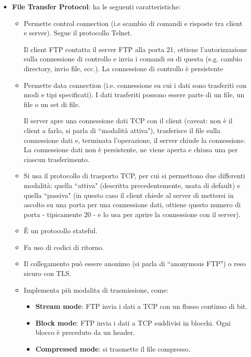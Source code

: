 \documentclass[11pt, italian, openany]{book}
\begin{document}
\begin{sloppypar}
\begin{itemize}[topsep=0pt]
	Per interrogazioni a server DNS si usa il tool "dig".
	\item \textbf{File Transfer Protocol}: ha le seguenti caratteristiche:
	\vspace{-3.5mm}
	\begin{itemize}
		\itemsep-0.3em
		\item Permette control connection (i.e scambio di comandi e risposte tra client e server). Segue il protocollo Telnet.

		Il client FTP contatta il server FTP alla porta 21, ottiene l’autorizzazione sulla connessione di controllo e invia i comandi su di questa
		(e.g. cambio directory, invio file, ecc.). La connessione di controllo \`e persistente
		\item Permette data connection (i.e. connessione su cui i dati sono trasferiti con modi e tipi specificati). I dati trasferiti possono essere
		parte di un file, un file o un set di file.

		Il server apre una connessione dati TCP con il client (caveat: non \`e il client a farlo, si parla di ``modalit\`a attiva"), trasferisce il
		file sulla connessione dati e, terminata l'operazione, il server chiude la connessione. La connessione dati non \`e persistente, ne viene
		aperta e chiusa una per ciascun trasferimento.
		\item Si usa il protocollo di trasporto TCP, per cui si permettono due differenti modalit\`a: quella ``attiva" (descritta precedentemente,
		usata di default) e quella ``passiva" (in questo caso il client chiede al server di mettersi in ascolto su una porta per una connessione dati,
		ottiene questo numero di porta - tipicamente 20 - e lo usa per aprire la connessione con il server).
		\item \`E un protocollo stateful.
		\item Fa uso di codici di ritorno.
		\item Il collegamento pu\`o essere anonimo (si parla di ``anonymous FTP") o reso sicuro con TLS.
		\item Implementa pi\`u modalita di trasmissione, come:
		\begin{itemize}[topsep=0pt]
			\itemsep-0.3em
			\item \textbf{Stream mode}: FTP invia i dati a TCP con un flusso continuo di bit.
			\item \textbf{Block mode}: FTP invia i dati a TCP suddivisi in blocchi. Ogni blocco è preceduto da un header.
			\item \textbf{Compressed mode}: si trasmette il file compresso.
			\end{itemize}
	\end{itemize}


\end{itemize}
\end{sloppypar}
\end{document}
